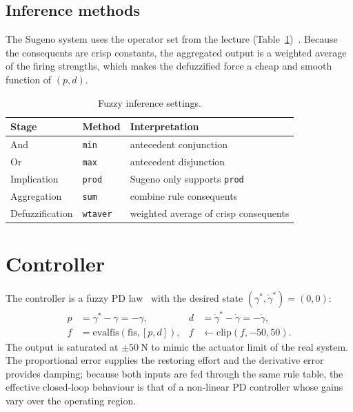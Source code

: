 \documentclass[11pt,a4paper]{article}
\newcommand{\gam}{\ensuremath{\gamma}}
\newcommand{\gamdot}{\ensuremath{\dot{\gamma}}}
\begin{document}
\subsection{Inference methods}
\label{sec:methods}

The Sugeno system uses the operator set from the lecture
(Table~\ref{tab:inference})~\cite{passino1998fuzzy,ross2010fuzzy}. Because the consequents are crisp constants, the
aggregated output is a weighted average of the firing strengths, which makes
the defuzzified force a cheap and smooth function of $(p,d)$.

\begin{table}[H]
\centering
\small
\begin{tabular}{@{}lll@{}}
\toprule
\textbf{Stage} & \textbf{Method} & \textbf{Interpretation} \\
\midrule
And            & \texttt{min}      & antecedent conjunction \\
Or             & \texttt{max}      & antecedent disjunction \\
Implication    & \texttt{prod}     & Sugeno only supports \texttt{prod} \\
Aggregation    & \texttt{sum}      & combine rule consequents \\
Defuzzification& \texttt{wtaver}   & weighted average of crisp consequents \\
\bottomrule
\end{tabular}
\caption{Fuzzy inference settings.}
\label{tab:inference}
\end{table}

\section{Controller}
\label{sec:controller}

The controller is a fuzzy PD law~\cite{astrom2006feedback} with the desired state $(\gam^\ast, \gamdot^\ast) = (0,0)$:
\begin{align}
  p &= \gam^\ast - \gam = -\gam, & d &= \gamdot^\ast - \gamdot = -\gamdot, \\
  f &= \mathrm{evalfis}(\mathrm{fis}, [p, d]), & f &\leftarrow \mathrm{clip}(f, -50, 50).
\end{align}
The output is saturated at $\pm\SI{50}{\N}$ to mimic the actuator limit of the
real system. The proportional error supplies the restoring effort and the
derivative error provides damping; because both inputs are fed through the same
rule table, the effective closed-loop behaviour is that of a non-linear PD
controller whose gains vary over the operating region.
\end{document}
